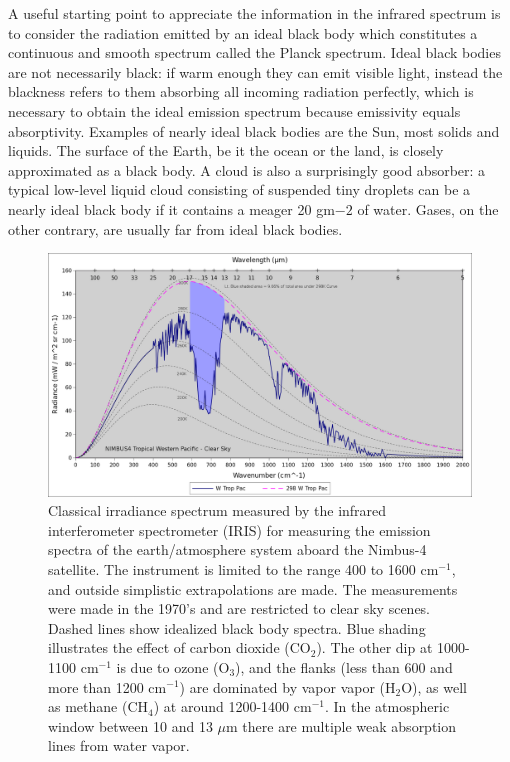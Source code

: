 \documentclass[12pt]{book}
\begin{document}
A useful starting point to appreciate the information in the infrared spectrum is to consider the radiation emitted by an ideal black body which constitutes a continuous and smooth spectrum called the Planck spectrum. Ideal black bodies are not necessarily black: if warm enough they can emit visible light, instead the blackness refers to them absorbing all incoming radiation perfectly, which is necessary to obtain the ideal emission spectrum because emissivity equals absorptivity. Examples of nearly ideal black bodies are the Sun, most solids and liquids. The surface of the Earth, be it the ocean or the land, is closely approximated as a black body. A cloud is also a surprisingly good absorber: a typical low-level liquid cloud consisting of suspended tiny droplets can be a nearly ideal black body if it contains a meager 20 gm${-2}$ of water. Gases, on the other contrary, are usually far from ideal black bodies. 

\begin{figure}
\begin{center}
\includegraphics[width=17 cm]{../external_figures/GW_Petty_IRIS_Tropical_Western_Pacific.png}
\end{center}
\caption{ Classical irradiance spectrum measured by the infrared interferometer spectrometer (IRIS) for measuring the emission spectra of the earth/atmosphere system aboard the Nimbus-4 satellite. The instrument is limited to the range 400 to 1600 cm$^{-1}$, and outside simplistic extrapolations are made. The measurements were made in the 1970's and are restricted to clear sky scenes. Dashed lines show idealized black body spectra. Blue shading illustrates the effect of carbon dioxide (CO$_2$). The other dip at 1000-1100 cm$^{-1}$ is due to ozone (O$_3$), and the flanks (less than 600 and more than 1200 cm$^{-1}$) are dominated by vapor vapor (H$_2$O), as well as methane (CH$_4$) at around 1200-1400 cm$^{-1}$. In the atmospheric window between 10 and 13 $\mu$m there are multiple weak absorption lines from water vapor. } 
\label{fig:radiation_spectrum}
\end{figure}
\end{document}
